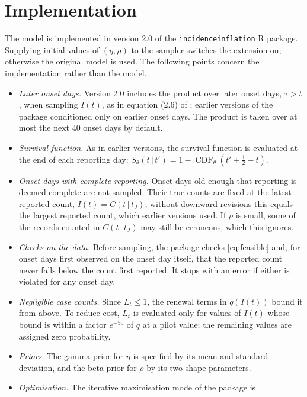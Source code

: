 \documentclass[11pt,a4paper]{article}
\newcommand{\given}{\,|\,}
\begin{document}
\section{Implementation}

The model is implemented in version 2.0 of the \texttt{incidenceinflation} R
package. Supplying initial values of $(\eta,\rho)$ to the sampler switches the
extension on; otherwise the original model is used. The following points
concern the implementation rather than the model.

\begin{itemize}[itemsep=2pt]
\item \emph{Later onset days.} Version 2.0 includes the product over later
onset days, $\tau>t$, when sampling $I(t)$, as in equation (2.6) of
\cite{bajaj2025}; earlier versions of the package conditioned only on earlier
onset days. The product is taken over at most the next 40 onset days by
default.
\item \emph{Survival function.} As in earlier versions, the survival function
is evaluated at the end of each reporting day:
$S_\theta(t\given t')=1-\operatorname{CDF}_\theta(t'+\tfrac12-t)$.
\item \emph{Onset days with complete reporting.} Onset days old enough that
reporting is deemed complete are not sampled. Their true counts are fixed at
the latest reported count, $I(t)=C(t\given t_J)$; without downward revisions
this equals the largest reported count, which earlier versions used. If $\rho$
is small, some of the records counted in $C(t\given t_J)$ may still be
erroneous, which this ignores.
\item \emph{Checks on the data.} Before sampling, the package checks
\eqref{eq:feasible} and, for onset days first observed on the onset day itself,
that the reported count never falls below the count first reported. It stops
with an error if either is violated for any onset day.
\item \emph{Negligible case counts.} Since $L_t\le 1$, the renewal terms in
$q(I(t))$ bound it from above. To reduce cost, $L_t$ is evaluated only for
values of $I(t)$ whose bound is within a factor $e^{-50}$ of $q$ at a pilot
value; the remaining values are assigned zero probability.
\item \emph{Priors.} The gamma prior for $\eta$ is specified by its mean and
standard deviation, and the beta prior for $\rho$ by its two shape parameters.
\item \emph{Optimisation.} The iterative maximisation mode of the package is

\end{itemize}
\end{document}
